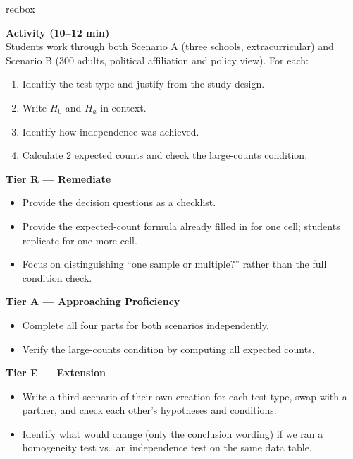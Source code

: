 \documentclass[10pt]{article}
\begin{document}
\begin{skillbox}{redbox}
\begin{minipage}[t]{0.48\linewidth}
    \textbf{Activity (10--12 min)}\\
    Students work through both Scenario A (three schools, extracurricular) and
    Scenario B (300 adults, political affiliation and policy view). For each:
    \begin{enumerate}
        \item Identify the test type and justify from the study design.
        \item Write $H_0$ and $H_a$ in context.
        \item Identify how independence was achieved.
        \item Calculate 2 expected counts and check the large-counts condition.
    \end{enumerate}
\end{minipage}
\hfill
\begin{minipage}[t]{0.48\linewidth}
    \textbf{Tier R --- Remediate}
    \begin{itemize}
        \item Provide the decision questions as a checklist.
        \item Provide the expected-count formula already filled in for one cell; students
              replicate for one more cell.
        \item Focus on distinguishing ``one sample or multiple?'' rather than the full
              condition check.
    \end{itemize}
    \textbf{Tier A --- Approaching Proficiency}
    \begin{itemize}
        \item Complete all four parts for both scenarios independently.
        \item Verify the large-counts condition by computing all expected counts.
    \end{itemize}
    \textbf{Tier E --- Extension}
    \begin{itemize}
        \item Write a third scenario of their own creation for each test type, swap
              with a partner, and check each other's hypotheses and conditions.
        \item Identify what would change (only the conclusion wording) if we ran
              a homogeneity test vs.\ an independence test on the same data table.
    \end{itemize}
\end{minipage}
\end{skillbox}
\end{document}
